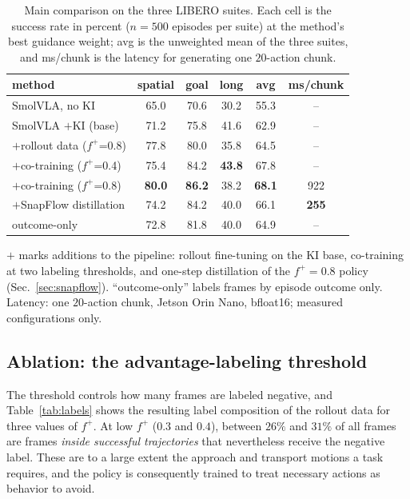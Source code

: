 \documentclass[conference]{IEEEtran}
\newcommand{\pf}{\ensuremath{f^{+}}}   %
\begin{document}
\begin{table}[t]
\caption{Main comparison on the three LIBERO suites. Each cell is the success rate in
percent ($n{=}500$ episodes per suite) at the method's best guidance weight; avg is the
unweighted mean of the three suites, and ms/chunk is the latency for generating one
$20$-action chunk.}
\label{tab:main}
\begin{center}
\begin{tabular}{lccccc}
\toprule
method & spatial & goal & long & avg & ms/chunk \\
\midrule
SmolVLA, no KI            & 65.0 & 70.6 & 30.2 & 55.3 & -- \\
SmolVLA $+$KI (base)      & 71.2 & 75.8 & 41.6 & 62.9 & -- \\
$+$rollout data (\pf{}=0.8) & 77.8 & 80.0 & 35.8 & 64.5 & -- \\
$+$co-training (\pf{}=0.4)   & 75.4 & 84.2 & \textbf{43.8} & 67.8 & -- \\
$+$co-training (\pf{}=0.8)   & \textbf{80.0} & \textbf{86.2} & 38.2 & \textbf{68.1} & 922 \\
  $+$SnapFlow distillation     & 74.2 & 84.2 & 40.0 & 66.1 & \textbf{255} \\
\midrule
outcome-only              & 72.8 & 81.8 & 40.0 & 64.9 & -- \\
\bottomrule
\end{tabular}
\end{center}
{\footnotesize $+$ marks additions to the pipeline: rollout fine-tuning on the KI base,
co-training at two labeling thresholds, and one-step distillation of the $\pf{=}0.8$
policy (Sec.~\ref{sec:snapflow}). ``outcome-only'' labels frames by episode outcome only.
Latency: one $20$-action chunk, Jetson Orin Nano, bfloat16; measured configurations only.}
\end{table}

\subsection{Ablation: the advantage-labeling threshold}\label{sec:dose}
The threshold controls how many frames are labeled negative, and Table~\ref{tab:labels}
shows the resulting label composition of the rollout data for three values of \pf{}. At low
\pf{} ($0.3$ and $0.4$), between $26\%$ and $31\%$ of all frames are frames \emph{inside
successful trajectories} that nevertheless receive the negative label. These are to a large
extent the approach and transport motions a task requires, and the policy is consequently
trained to treat necessary actions as behavior to avoid.
\end{document}
